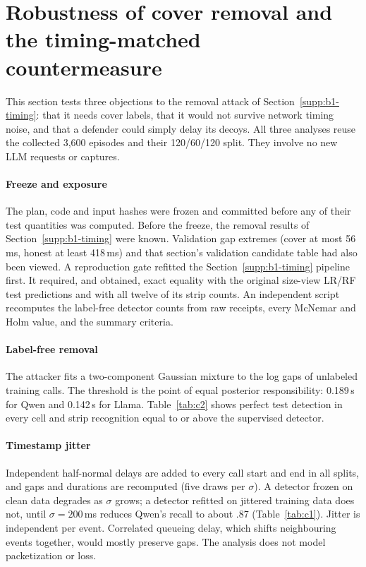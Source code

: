 \section{Robustness of cover removal and the timing-matched countermeasure}\label{supp:c-ext}
This section tests three objections to the removal attack of Section~\ref{supp:b1-timing}: that it needs cover labels, that it would not survive network timing noise, and that a defender could simply delay its decoys. All three analyses reuse the collected 3,600 episodes and their 120/60/120 split. They involve no new LLM requests or captures.

\paragraph{Freeze and exposure}
The plan, code and input hashes were frozen and committed before any of their test quantities was computed. Before the freeze, the removal results of Section~\ref{supp:b1-timing} were known. Validation gap extremes (cover at most 56\,ms, honest at least 418\,ms) and that section's validation candidate table had also been viewed. A reproduction gate refitted the Section~\ref{supp:b1-timing} pipeline first. It required, and obtained, exact equality with the original size-view LR/RF test predictions and with all twelve of its strip counts. An independent script recomputes the label-free detector counts from raw receipts, every McNemar and Holm value, and the summary criteria.

\paragraph{Label-free removal}
The attacker fits a two-component Gaussian mixture to the log gaps of unlabeled training calls. The threshold is the point of equal posterior responsibility: 0.189\,s for Qwen and 0.142\,s for Llama. Table~\ref{tab:c2} shows perfect test detection in every cell and strip recognition equal to or above the supervised detector.

\paragraph{Timestamp jitter}
Independent half-normal delays are added to every call start and end in all splits, and gaps and durations are recomputed (five draws per $\sigma$). A detector frozen on clean data degrades as $\sigma$ grows; a detector refitted on jittered training data does not, until $\sigma=200$\,ms reduces Qwen's recall to about .87 (Table~\ref{tab:c1}). Jitter is independent per event. Correlated queueing delay, which shifts neighbouring events together, would mostly preserve gaps. The analysis does not model packetization or loss.

